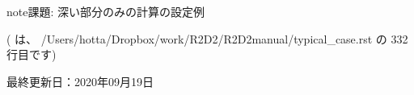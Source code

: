 \documentclass[letterpaper,10pt,dvipdfmx,report]{sphinxmanual}
\begin{document}
\begin{sphinxadmonition}{note}{課題:}
深い部分のみの計算の設定例
\end{sphinxadmonition}

({\hyperref[\detokenize{typical_case:id9}]{}} は、 /Users/hotta/Dropbox/work/R2D2/R2D2\sphinxhyphen{}manual/typical\_case.rst の 332 行目です)

最終更新日：2020年09月19日


\renewcommand{\indexname}{Pythonモジュール索引}
\begin{sphinxtheindex}
\let\bigletter\sphinxstyleindexlettergroup
\bigletter{r}
\item\relax{}
\end{sphinxtheindex}

\renewcommand{\indexname}{索引}
\printindex
\end{document}

